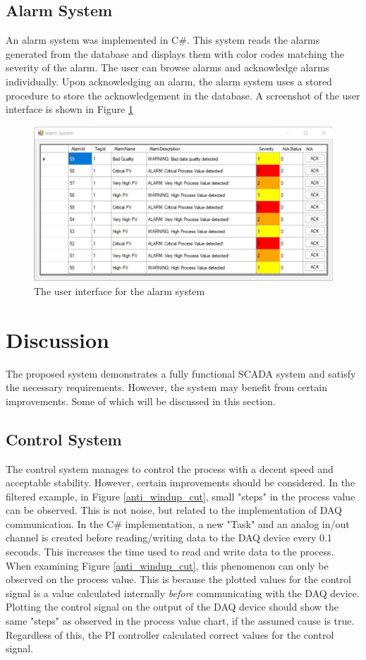 \documentclass[conference]{IEEEtran}
\begin{document}
\subsection{Alarm System}
An alarm system was implemented in C\#. This system reads the alarms generated from the database and displays them with color codes matching the severity of the alarm. The user can browse alarms and acknowledge alarms individually. Upon acknowledging an alarm, the alarm system uses a stored procedure to store the acknowledgement in the database. A screenshot of the user interface is shown in Figure \ref{alarm_system}

\begin{figure}[H]
    \centering
    \includegraphics[scale=0.42]{media/alarm_system.png}
    \caption{The user interface for the alarm system}
    \label{alarm_system}
\end{figure}

\section{Discussion}
The proposed system demonstrates a fully functional SCADA system and satisfy the necessary requirements. However, the system may benefit from certain improvements. Some of which will be discussed in this section.

\subsection{Control System}
The control system manages to control the process with a decent speed and acceptable stability. However, certain improvements should be considered. In the filtered example, in Figure \ref{anti_windup_cut}, small "steps" in the process value can be observed. This is not noise, but related to the implementation of DAQ communication. In the C\# implementation, a new "Task" and an analog in/out channel is created before reading/writing data to the DAQ device every 0.1 seconds. This increases the time used to read and write data to the process. When examining Figure \ref{anti_windup_cut}, this phenomenon can only be observed on the process value. This is because the plotted values for the control signal is a value calculated internally \textit{before} communicating with the DAQ device. Plotting the control signal on the output of the DAQ device should show the same "steps" as observed in the process value chart, if the assumed cause is true.  Regardless of this, the PI controller calculated correct values for the control signal.
\end{document}
